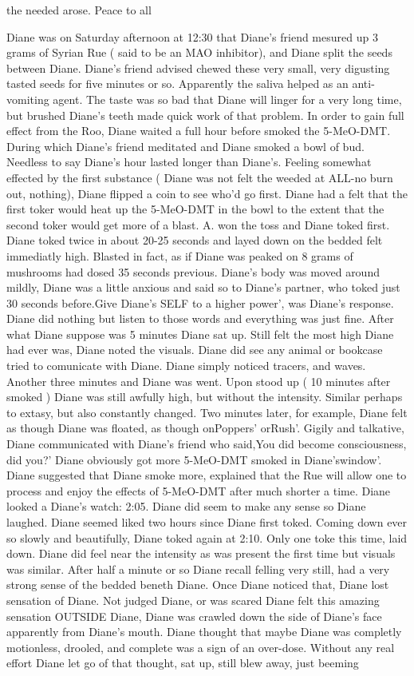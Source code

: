 \documentclass[12pt]{book}
\begin{document}
the needed arose. Peace to all



Diane was on Saturday afternoon at 12:30 that Diane's friend mesured up 3 grams of Syrian Rue ( said to be an MAO inhibitor), and Diane split the seeds between Diane. Diane's friend advised chewed these very small, very digusting tasted seeds for five minutes or so. Apparently the saliva helped as an anti-vomiting agent. The taste was so bad that Diane will linger for a very long time, but brushed Diane's teeth made quick work of that problem. In order to gain full effect from the Roo, Diane waited a full hour before smoked the 5-MeO-DMT. During which Diane's friend meditated and Diane smoked a bowl of bud. Needless to say Diane's hour lasted longer than Diane's. Feeling somewhat effected by the first substance ( Diane was not felt the weeded at ALL-no burn out, nothing), Diane flipped a coin to see who'd go first. Diane had a felt that the first toker would heat up the 5-MeO-DMT in the bowl to the extent that the second toker would get more of a blast. A. won the toss and Diane toked first. Diane toked twice in about 20-25 seconds and layed down on the bedded felt immediatly high. Blasted in fact, as if Diane was peaked on 8 grams of mushrooms had dosed 35 seconds previous. Diane's body was moved around mildly, Diane was a little anxious and said so to Diane's partner, who toked just 30 seconds before.Give Diane's SELF to a higher power', was Diane's response. Diane did nothing but listen to those words and everything was just fine. After what Diane suppose was 5 minutes Diane sat up. Still felt the most high Diane had ever was, Diane noted the visuals. Diane did see any animal or bookcase tried to comunicate with Diane. Diane simply noticed tracers, and waves. Another three minutes and Diane was went. Upon stood up ( 10 minutes after smoked ) Diane was still awfully high, but without the intensity. Similar perhaps to extasy, but also constantly changed. Two minutes later, for example, Diane felt as though Diane was floated, as though onPoppers' orRush'. Gigily and talkative, Diane communicated with Diane's friend who said,You did become consciousness, did you?' Diane obviously got more 5-MeO-DMT smoked in Diane'swindow'. Diane suggested that Diane smoke more, explained that the Rue will allow one to process and enjoy the effects of 5-MeO-DMT after much shorter a time. Diane looked a Diane's watch: 2:05. Diane did seem to make any sense so Diane laughed. Diane seemed liked two hours since Diane first toked. Coming down ever so slowly and beautifully, Diane toked again at 2:10. Only one toke this time, laid down. Diane did feel near the intensity as was present the first time but visuals was similar. After half a minute or so Diane recall felling very still, had a very strong sense of the bedded beneth Diane. Once Diane noticed that, Diane lost sensation of Diane. Not judged Diane, or was scared Diane felt this amazing sensation OUTSIDE Diane, Diane was crawled down the side of Diane's face apparently from Diane's mouth. Diane thought that maybe Diane was completly motionless, drooled, and complete was a sign of an over-dose. Without any real effort Diane let go of that thought, sat up, still blew away, just beeming 
\end{document}
